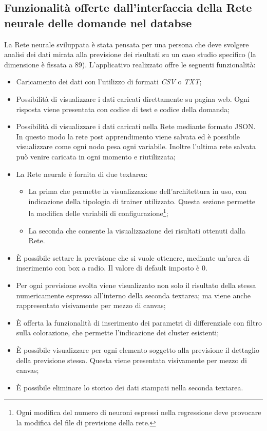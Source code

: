\subsection{Funzionalit\`a offerte dall'interfaccia della Rete neurale delle domande nel databse}
\label{Funzionalita offerte dall'interfaccia della Rete neurale}
La Rete neurale sviluppata \`e stata pensata per una persona che deve svolgere analisi dei dati mirata alla previsione dei risultati su un caso studio specifico (la dimensione \`e fissata a 89). L'applicativo realizzato offre le seguenti funzionalit\`a:
\begin{itemize}
\item Caricamento dei dati con l'utilizzo di formati \textit{CSV} o \textit{TXT};
\item Possibilit\`a di visualizzare i dati caricati direttamente su pagina web. Ogni risposta viene presentata con codice di test e codice della domanda;
\item Possibilit\`a di visualizzare i dati caricati nella Rete mediante formato JSON. In questo modo la rete post apprendimento viene salvata ed \`e possibile visualizzare come ogni nodo pesa ogni variabile. Inoltre l'ultima rete salvata pu\`o venire caricata in ogni momento e riutilizzata;
\item La Rete neurale \`e fornita di due textarea: 
\begin{itemize}
\item La prima che permette la visualizzazione dell'architettura in uso, con indicazione della tipologia di trainer utilizzato. Questa sezione permette la modifica delle variabili di configurazione\footnote{Ogni modifica del numero di neuroni espressi nella regressione deve provocare la modifica del file di previsione della rete.};
\item La seconda che consente la visualizzazione dei risultati ottenuti dalla Rete.
\end{itemize}
\item \`E possibile settare la previsione che si vuole ottenere, mediante un'area di inserimento con box a radio. Il valore di default imposto \`e 0. 
\item Per ogni previsione svolta viene visualizzato non solo il risultato della stessa numericamente espresso all'interno della seconda textarea; ma viene anche rappresentato visivamente per mezzo di canvas;
\item \`E offerta la funzionalit\`a di inserimento dei parametri di differenziale con filtro sulla colorazione, che permette l'indicazione dei cluster esistenti;
\item \`E possibile visualizzare per ogni elemento soggetto alla previsione il dettaglio della previsione stessa. Questa viene presentata visivamente per mezzo di canvas;
\item \`E possibile eliminare lo storico dei dati stampati nella seconda textarea.
\end{itemize}


